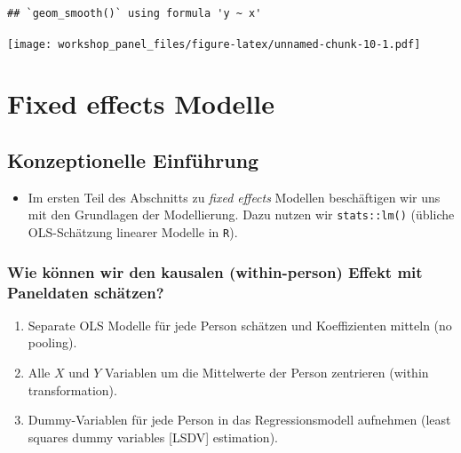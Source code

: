\documentclass[
]{book}
\providecommand{\tightlist}{%
  \setlength{\itemsep}{0pt}\setlength{\parskip}{0pt}}
\begin{document}
\begin{verbatim}
## `geom_smooth()` using formula 'y ~ x'
\end{verbatim}

\texttt{[image: workshop\_panel\_files/figure-latex/unnamed-chunk-10-1.pdf]}

\hypertarget{fixed-effects-modelle}{%
\chapter{Fixed effects Modelle}\label{fixed-effects-modelle}}

\hypertarget{konzeptionelle-einfuxfchrung}{%
\section{Konzeptionelle Einführung}\label{konzeptionelle-einfuxfchrung}}

\begin{itemize}
\tightlist
\item
  Im ersten Teil des Abschnitts zu \emph{fixed effects} Modellen beschäftigen wir uns mit den Grundlagen der Modellierung. Dazu nutzen wir \texttt{stats::lm()} (übliche OLS-Schätzung linearer Modelle in \texttt{R}).
\end{itemize}

\hypertarget{wie-kuxf6nnen-wir-den-kausalen-within-person-effekt-mit-paneldaten-schuxe4tzen}{%
\subsection*{Wie können wir den kausalen (within-person) Effekt mit Paneldaten schätzen?}\label{wie-kuxf6nnen-wir-den-kausalen-within-person-effekt-mit-paneldaten-schuxe4tzen}}

\begin{enumerate}
\def\labelenumi{\arabic{enumi})}
\tightlist
\item
  Separate OLS Modelle für jede Person schätzen und Koeffizienten mitteln (no pooling).
\item
  Alle \(X\) und \(Y\) Variablen um die Mittelwerte der Person zentrieren (within transformation).
\item
  Dummy-Variablen für jede Person in das Regressionsmodell aufnehmen (least squares dummy variables {[}LSDV{]} estimation).
\end{enumerate}
\end{document}
